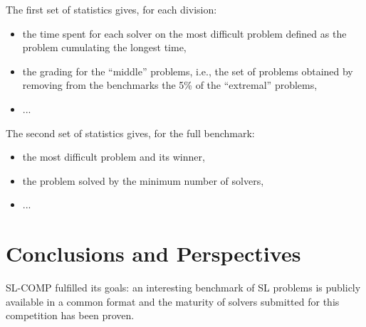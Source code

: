 \documentclass{llncs}
\begin{document}
The first set of statistics gives, for each division:
\begin{itemize}
\item the time spent for each solver on the most difficult problem defined as the problem cumulating the longest time,
\item the grading for the ``middle'' problems, i.e., the set of problems obtained by removing from the benchmarks the 5\% of the ``extremal'' problems,
\item ...
\end{itemize}

The second set of statistics gives, for the full benchmark:
\begin{itemize}
\item the most difficult problem and its winner,
\item the problem solved by the minimum number of solvers,
\item ...
\end{itemize}



\section{Conclusions and Perspectives}

SL-COMP fulfilled its goals:
an interesting benchmark of SL problems is publicly available in a common format and
the maturity of solvers submitted for this competition  has been proven.
\end{document}
